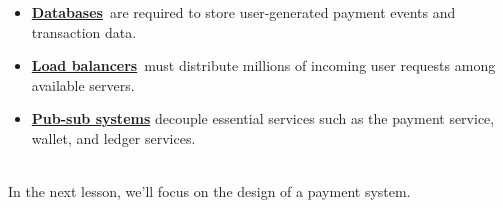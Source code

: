 \begin{itemize}
\item
\protect{}\label{SoJXSLGRlKpfGVIutZDHy}
\href{https://www.educative.io/courses/grokking-the-system-design-interview/introduction-to-databases}{\textbf{Databases}}~are required to store user-generated payment events and transaction data.
\item
\protect{}\label{ku0zVqQPIuzZkC2Drf6wB}
\href{https://www.educative.io/courses/grokking-the-system-design-interview/introduction-to-load-balancers}{\textbf{Load balancers}}~must distribute millions of incoming user requests among available servers.
\item
\protect{}\label{GKKiCEVEw7-rr637G73VC}
\href{https://www.educative.io/courses/grokking-the-system-design-interview/system-design-the-pub-sub-abstraction}{\textbf{Pub-sub systems}} decouple essential services such as the payment service, wallet, and ledger services.
\end{itemize}
\\
In the next lesson, we'll focus on the design of a payment system.

